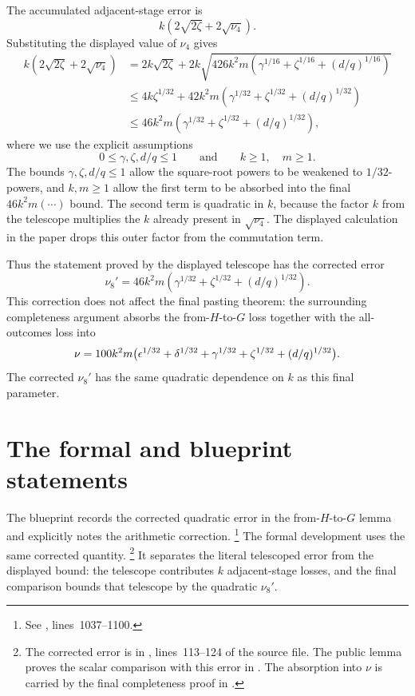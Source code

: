 \documentclass[11pt]{article}
\begin{document}
The accumulated adjacent-stage error is
\[
  k(2\sqrt{2\zeta}+2\sqrt{\nu_4}).
\]
Substituting the displayed value of $\nu_4$ gives
\[
\begin{aligned}
  k(2\sqrt{2\zeta}+2\sqrt{\nu_4})
  &= 2k\sqrt{2\zeta}
     +2k\sqrt{426k^2m
       (\gamma^{1/16}+\zeta^{1/16}+(d/q)^{1/16})} \\
  &\le 4k\zeta^{1/32}
     +42k^2m(\gamma^{1/32}+\zeta^{1/32}+(d/q)^{1/32}) \\
  &\le 46k^2m(\gamma^{1/32}+\zeta^{1/32}+(d/q)^{1/32}),
\end{aligned}
\]
where we use the explicit assumptions
\[
  0 \le \gamma,\zeta,d/q \le 1
  \qquad\text{and}\qquad
  k \ge 1,\quad m \ge 1.
\]
The bounds $\gamma,\zeta,d/q \le 1$ allow the square-root powers to be
weakened to $1/32$-powers, and $k,m\ge 1$ allow the first term to be absorbed
into the final $46k^2m(\cdots)$ bound. The second term is quadratic in $k$,
because the factor $k$ from the telescope multiplies the $k$ already present
in $\sqrt{\nu_4}$. The displayed calculation in the paper drops this outer
factor from the commutation term.

Thus the statement proved by the displayed telescope has the corrected error
\[
  \nu_8'
  = 46k^2m(\gamma^{1/32}+\zeta^{1/32}+(d/q)^{1/32}).
\]
This correction does not affect the final pasting theorem: the surrounding
completeness argument absorbs the from-$H$-to-$G$ loss together with the
all-outcomes loss into
\[
  \nu
  =100k^2m\bigl(\epsilon^{1/32}+\delta^{1/32}+\gamma^{1/32}
      +\zeta^{1/32}+(d/q)^{1/32}\bigr).
\]
The corrected $\nu_8'$ has the same quadratic dependence on $k$ as this
final parameter.

\section{The formal and blueprint statements}

The blueprint records the corrected quadratic error in the from-$H$-to-$G$
lemma and explicitly notes the arithmetic correction.%
\footnote{See , lines~1037--1100.}
The formal development uses the same corrected quantity.%
\footnote{The corrected error is 
in , lines~113--124 of the
source file. The public lemma  proves
the scalar comparison with this error in
. The absorption into
$\nu$ is carried by the final completeness proof in
.}
It separates the literal telescoped error from the displayed bound: the
telescope contributes $k$ adjacent-stage losses, and the final comparison
bounds that telescope by the quadratic $\nu_8'$.
\end{document}

